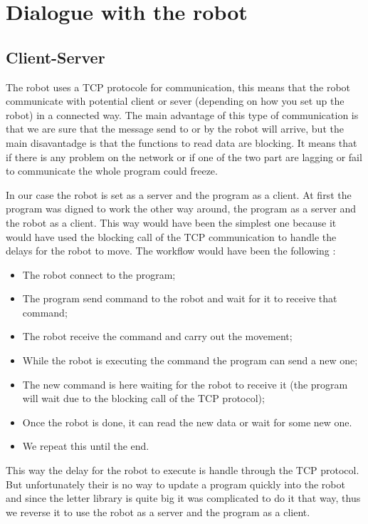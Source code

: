 \section{Dialogue with the robot}

\subsection{Client-Server}

The robot uses a TCP protocole for communication, this means that the robot communicate with potential client or sever (depending on how you set up the robot) in a connected way. The main advantage of this type of communication is that we are sure that the message send to or by the robot will arrive, but the main disavantadge is that the functions to read data are blocking. It means that if there is any problem on the network or if one of the two part are lagging or fail to communicate the whole program could freeze.

In our case the robot is set as a server and the program as a client. At first the program was digned to work the other way around, the program as a server and the robot as a client. This way would have been the simplest one because it would have used the blocking call of the TCP communication to handle the delays for the robot to move.
The workflow would have been the following :
\begin{itemize}
    \item The robot connect to the program;
    \item The program send command to the robot and wait for it to receive that command;
    \item The robot receive the command and carry out the movement;
    \item While the robot is executing the command the program can send a new one;
    \item The new command is here waiting for the robot to receive it (the program will wait due to the blocking call of the TCP protocol);
    \item Once the robot is done, it can read the new data or wait for some new one.
    \item We repeat this until the end.
\end{itemize}

This way the delay for the robot to execute is handle through the TCP protocol. But unfortunately their is no way to update a program quickly into the robot and since the letter library is quite big it was complicated to do it that way, thus we reverse it to use the robot as a server and the program as a client.

